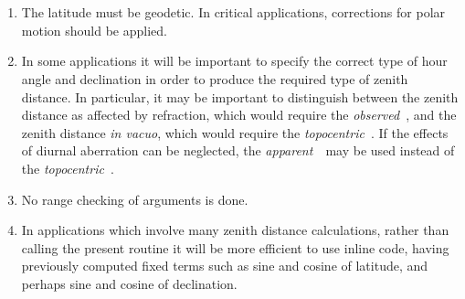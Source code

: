{
}
{
  \\
  \\
}
{
}
\notes
{
 \begin{enumerate}
  \item The latitude must be geodetic.  In critical applications,
        corrections for polar motion should be applied.
  \item In some applications it will be important to specify the
        correct type of hour angle and declination in order to
        produce the required type
        of zenith distance.  In particular, it may be
        important to distinguish between the zenith distance
        as affected by refraction, which would require the
        {\it observed}\, \hadec, and the zenith distance {\it in vacuo},
        which would require the {\it topocentric}\, \hadec.  If
        the effects of diurnal aberration can be neglected, the
        {\it apparent}\, \hadec\ may be used instead of the
        {\it topocentric}\, \hadec.
  \item No range checking of arguments is done.
  \item In applications which involve many zenith distance calculations,
        rather than calling the present routine it will be more
        efficient to use inline code, having previously computed fixed
        terms such as sine and cosine of latitude, and perhaps sine and
        cosine of declination.
 \end{enumerate}
}

